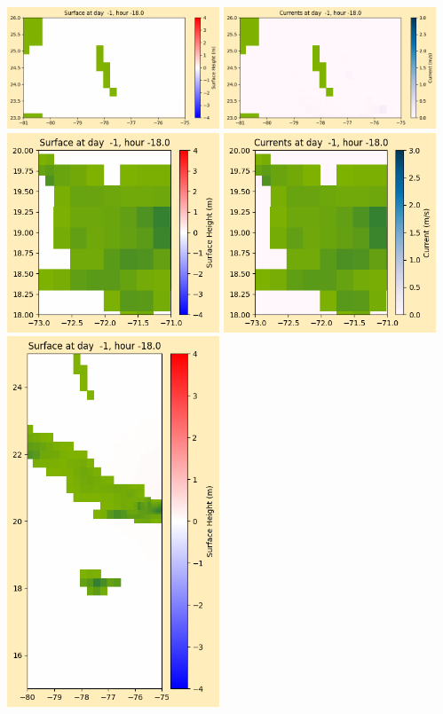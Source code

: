 \documentclass[11pt]{article}
\begin{document}
\vskip 10pt 
\includegraphics[width=0.475\textwidth]{frame0005fig1003.png}
\includegraphics[width=0.475\textwidth]{frame0005fig1004.png}
\vskip 10pt 
\includegraphics[width=0.475\textwidth]{frame0005fig1005.png}
\includegraphics[width=0.475\textwidth]{frame0005fig1006.png}
\vskip 10pt 
\includegraphics[width=0.475\textwidth]{frame0005fig1007.png}
\end{document}
